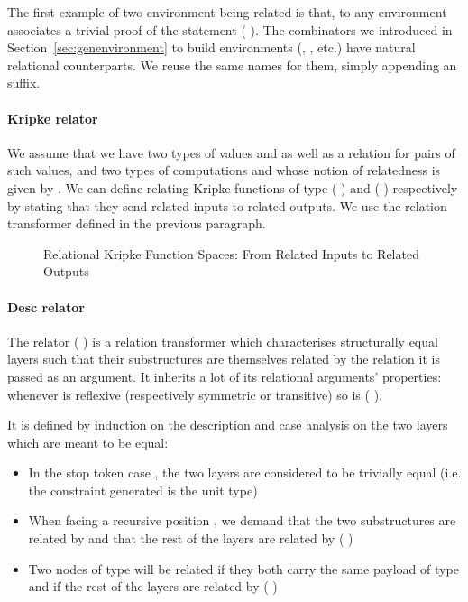 The first example of two environment being related is  that, to any
environment  associates a trivial proof of the statement
{(    )}.
The combinators we introduced in Section~\ref{sec:genenvironment} to build environments
(, , etc.) have natural relational counterparts. We reuse the same
names for them, simply appending an  suffix.

\paragraph{Kripke relator}
We assume that we have two types of values  and 
as well as a relation  for pairs of such values, and two types of computations
 and  whose notion of relatedness is given by . We can define
 relating Kripke functions of type
{(  )} and {(  )}
respectively by stating that they send related inputs
to related outputs. We use the relation transformer  defined in the previous
paragraph.

\begin{figure}[h]
\caption{Relational Kripke Function Spaces: From Related Inputs to Related Outputs\label{fig:Kripke-rel}}
\end{figure}

\paragraph{Desc relator}
The relator (  ) is a relation transformer which characterises
structurally equal layers such that their substructures are themselves related
by the relation it is passed as an argument. It inherits a lot of its relational
arguments' properties: whenever  is reflexive (respectively symmetric or
transitive) so is {(   )}.\label{lem:zipstable}

It is defined by induction on the description and case analysis on the two
layers which are meant to be equal:
\begin{itemize}
  \item In the stop token case  , the two layers are considered to
    be trivially equal (i.e. the constraint generated is the unit type)
  \item When facing a recursive position { \AB{$\Delta$}  }, we
    demand that the two substructures are related by { \AB{$\Delta$} }
    and that the rest of the layers are related by (   )
  \item Two nodes of type {  } will
    be related if they both carry the same payload  of type  and if
    the rest of the layers are related by (    )
\end{itemize}

